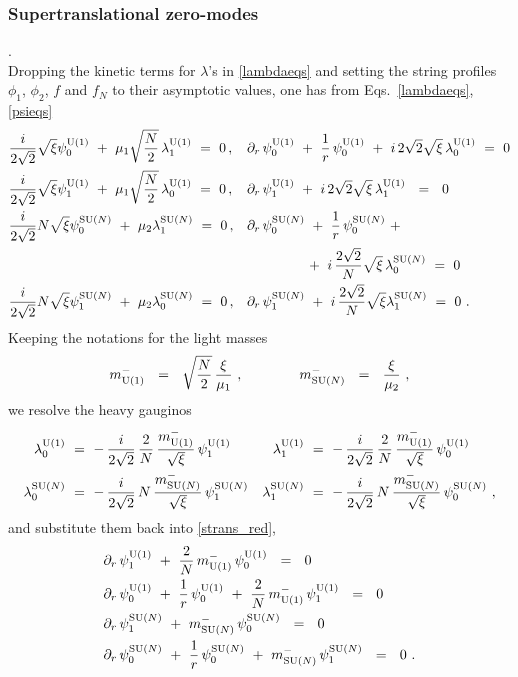 \documentclass[12pt]{article}
\newcommand{\p}{\partial}
\newcommand{\mUm}{m_{\rm U(1)}^{-}}
\newcommand{\mNm}{m_\text{SU($N$)}^{-}}
\newcommand{\loU}{\lambda_0^{\rm U(1)}}
\newcommand{\llU}{\lambda_1^{\rm U(1)}}
\newcommand{\loN}{\lambda_0^\text{SU($N$)}}
\newcommand{\llN}{\lambda_1^\text{SU($N$)}}
\newcommand{\poU}{\psi_0^{\rm U(1)}}
\newcommand{\plU}{\psi_1^{\rm U(1)}}
\newcommand{\poN}{\psi_0^\text{SU($N$)}}
\newcommand{\plN}{\psi_1^\text{SU($N$)}}
\begin{document}
\subsubsection{Supertranslational zero-modes}
	{.}\\
	Dropping the kinetic terms for $ \lambda $'s in \eqref{lambdaeqs} and setting the string
	profiles $ \phi_1 $, $ \phi_2 $, $ f $ and $ f_N $ to their asymptotic values, one has
	from Eqs.~\eqref{lambdaeqs}, \eqref{psieqs}
\begin{align}
%
\notag
& 
	\frac{i}{2\sqrt{2}} \sqrt{\xi} \poU ~+~ \mu_1 \sqrt{\frac{N}{2}}\, \llU ~=~ 0\,,   
&&
	\p_r \,\poU ~+~ \frac{1}{r}\,\poU ~+~ i\, 2\sqrt{2}\sqrt{\xi}\, \loU ~=~ 0 
\\
%
\notag
& 
	\frac{i}{2\sqrt{2}} \sqrt{\xi} \plU ~+~ \mu_1 \sqrt{\frac{N}{2}}\, \loU ~=~ 0\,,      
&&
	\p_r \, \plU ~+~ i\,2\sqrt{2}\sqrt{\xi}\,\llU ~~=~~ 0
\\
%
\label{strans_red}
&
	\frac{i}{2\sqrt{2}} N\sqrt{\xi} \poN ~+~ \mu_2 \llN ~=~ 0\,,     
&&
	\p_r \,\poN ~+~ \frac{1}{r}\, \poN ~+~ \\
\notag &&& \qquad\qquad
	~+~ i\,\frac{2\sqrt{2}}{N} \sqrt{\xi}\, \loN ~=~ 0\,
\\
%
\notag
&
	\frac{i}{2\sqrt{2}} N\sqrt{\xi} \plN ~+~ \mu_2 \loN ~=~ 0\,,   
&&
	\p_r \,\plN ~+~ i\,\frac{2\sqrt{2}}{N}\sqrt{\xi} \llN ~=~ 0~.
\end{align}
	Keeping the notations for the light masses 
\[
	\mUm ~~=~~ \sqrt{\frac{N}{2}}\, \frac{\xi}{\mu_1}~,  \qquad\qquad \mNm ~~=~~ \frac{\xi}{\mu_2}~,
\]
	we resolve the heavy gauginos
\begin{align}
%
\notag
	\loU & ~=~ -\, \frac{i}{2\sqrt{2}}\, \frac{2}{N}\, \frac{\mUm}{\sqrt{\xi}}\, \plU 
&
	\llU & ~=~ -\, \frac{i}{2\sqrt{2}}\, \frac{2}{N}\, \frac{\mUm}{\sqrt{\xi}}\, \poU \\
%
\label{heavy_gauginos}
	\loN & ~=~ -\, \frac{i}{2\sqrt{2}}\, N\, \frac{\mNm}{\sqrt{\xi}}\, \plN
&
	\llN & ~=~ -\, \frac{i}{2\sqrt{2}}\, N\, \frac{\mNm}{\sqrt{\xi}}\, \poN ~,
\end{align}
	and substitute them back into \eqref{strans_red},
\begin{align*}
%
	& \p_r\, \plU ~+~ \frac{2}{N}\,\mUm\,\poU ~~=~~ 0 \\
%
	& \p_r\, \poU ~+~ \frac{1}{r}\,\poU ~+~ \frac{2}{N}\,\mUm\,\plU ~~=~~ 0 \\
%
	& \p_r\, \plN ~+~ \mNm\,\poN ~~=~~ 0 \\
%
	& \p_r\, \poN ~+~ \frac{1}{r}\,\poN ~+~ \mNm\,\plN ~~=~~ 0~.
%
\end{align*}
\end{document}
